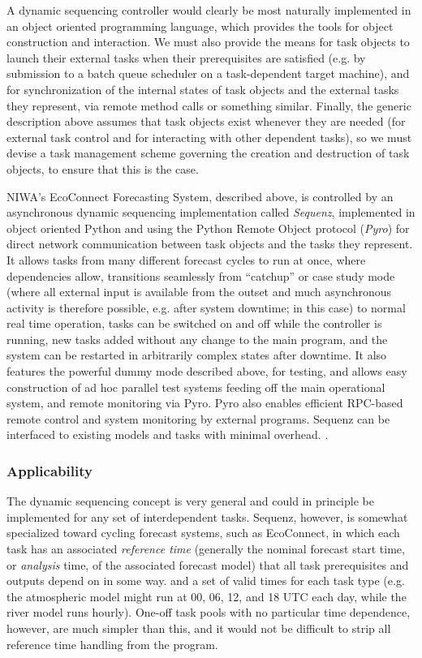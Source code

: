 \documentclass[11pt,a4paper]{article}
\begin{document}
A dynamic sequencing controller would clearly be most naturally
implemented in an object oriented programming language, which provides
the tools for object construction and interaction.  We must also provide
the means for task objects to launch their external tasks when their
prerequisites are satisfied (e.g.  by submission to a batch queue
scheduler on a task-dependent target machine), and for synchronization
of the internal states of task objects and the external tasks they
represent, via remote method calls or something similar.  Finally, the
generic description above assumes that task objects exist whenever they
are needed (for external task control and for interacting with other
dependent tasks), so we must devise a task management scheme governing
the creation and destruction of task objects, to ensure that this is the
case.

NIWA's EcoConnect Forecasting System, described above, is controlled by
an asynchronous dynamic sequencing implementation called {\em Sequenz},
implemented in object oriented Python and using the Python Remote Object
protocol ({\em Pyro}) for direct network communication between task
objects and the tasks they represent. It allows tasks from many
different forecast cycles to run at once, where dependencies allow,
transitions seamlessly from ``catchup'' or case study mode (where all
external input is available from the outset and much asynchronous
activity is therefore possible, e.g. after system downtime;
in this case) to normal real time
operation, tasks can be switched on and off while the controller is
running, new tasks added without any change to the main program, and the
system can be restarted in arbitrarily complex states after downtime.
It also features the powerful dummy mode described above, for testing,
and allows easy construction of ad hoc parallel test systems feeding off
the main operational system, and remote monitoring via Pyro. Pyro also
enables efficient RPC-based remote control and system monitoring by
external programs.  Sequenz can be interfaced to existing models and
tasks with minimal overhead.  .


\subsubsection{Applicability}

The dynamic sequencing concept is very general and could in principle be
implemented for any set of interdependent tasks. Sequenz, however, is
somewhat specialized toward cycling forecast systems, such as
EcoConnect, in which each task has an associated {\em reference time}
(generally the nominal forecast start time, or {\em analysis} time, of
the associated forecast model) that all task prerequisites and outputs
depend on in some way. and a set of valid times for each task type (e.g.
the atmospheric model might run at 00, 06, 12, and 18 UTC each day,
while the river model runs hourly).  One-off task pools with no
particular time dependence, however, are much simpler than this, and it
would not be difficult to strip all reference time handling from the
program.
\end{document}
